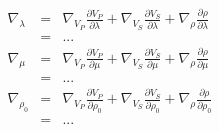 \documentclass[9pt]{beamer}
\newcommand{\partderi}[2]{\frac{\partial#1}{\partial#2}}
\begin{document}
\begin{frame}
\begin{minipage}{0.45\linewidth}
    \begin{eqnarray}
      \nabla_{\lambda}&=& \nabla_{V_P} \partderi{V_P}{\lambda} + \nabla_{V_S} \partderi{V_S}{\lambda} + \nabla_{\rho} \partderi{\rho}{\lambda} \nonumber\\
                      &=& ... \nonumber\\
      \nabla_{\mu}    &=& \nabla_{V_P} \partderi{V_P}{\mu}     + \nabla_{V_S} \partderi{V_S}{\mu}     + \nabla_{\rho} \partderi{\rho}{\mu} \nonumber\\
		      &=& ... \nonumber\\
      \nabla_{\rho_0} &=& \nabla_{V_P} \partderi{V_P}{\rho_0}  + \nabla_{V_S} \partderi{V_S}{\rho_0}  + \nabla_{\rho} \partderi{\rho}{\rho_0} \nonumber\\
		      &=& ... \nonumber
    \end{eqnarray}
  \end{minipage}

\end{frame}
\end{document}

